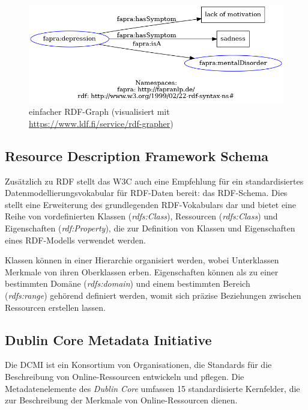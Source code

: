 \begin{figure}[h]
    \centering
    \includegraphics[width=\textwidth]{pictures/rdf-graph.png}
    \caption{einfacher RDF-Graph (visualisiert mit \url{https://www.ldf.fi/service/rdf-grapher})}
    \label{fig:rdfgraph}
\end{figure}

\subsection{Resource Description Framework Schema}

Zusätzlich zu RDF stellt das W3C auch eine Empfehlung für ein standardisiertes Datenmodellierungsvokabular für RDF-Daten bereit: das RDF-Schema. Dies stellt eine Erweiterung des grundlegenden RDF-Vokabulars dar und bietet eine Reihe von vordefinierten Klassen (\emph{rdfs:Class}), Ressourcen (\emph{rdfs:Class}) und Eigenschaften (\emph{rdf:Property}), die zur Definition von Klassen und Eigenschaften eines RDF-Modells verwendet werden.

Klassen können in einer Hierarchie organisiert werden, wobei Unterklassen Merkmale von ihren Oberklassen erben. Eigenschaften können als zu einer bestimmten Domäne (\emph{rdfs:domain}) und einem bestimmten Bereich \\
(\emph{rdfs:range}) gehörend definiert werden, womit sich präzise Beziehungen zwischen Ressourcen erstellen lassen.



\subsection{Dublin Core Metadata Initiative}
Die \ac{DCMI}\cite{DCMI_dcmi_2022} ist ein Konsortium von Organisationen, die Standards für die Beschreibung von Online-Ressourcen entwickeln und pflegen. Die Metadatenelemente des \emph{Dublin Core} umfassen 15 standardisierte Kernfelder, die zur Beschreibung der Merkmale von Online-Ressourcen dienen.

